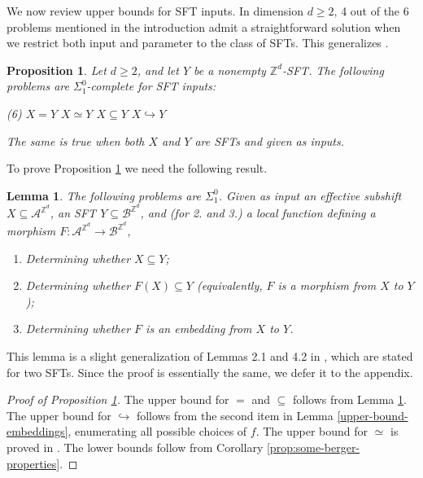 \documentclass[a4paper]{article}
\newcommand{\Z}{\mathbb{Z}}
\newcommand{\Zd}{\mathbb{Z}^d}
\newcommand{\A}{\mathcal{A}}
\newcommand{\B}{\mathcal{B}}
\newtheorem{lemma}[theorem]{Lemma}
\newtheorem{proposition}[theorem]{Proposition}
\theoremstyle{definition}
\begin{document}
We now review upper bounds for SFT inputs. In dimension $d\geq 2$, 4 out of the 6 problems mentioned in the introduction admit a straightforward solution when we restrict both input and parameter to the class of SFTs. This generalizes \cite[Theorem 2.4]{jeandel_hardness_2015}. 

\begin{proposition}\label{upper-bounds-two-SFTs}\label{upper-bound-inclusion-uniform-sfts}\label{conjugacy-two-SFTs} 
Let $d\geq 2$, and let $Y$ be a nonempty $\Z^d$-SFT. The following problems are $\Sigma_1^0$-complete for SFT inputs:
\begin{tasks}[style=itemize](6)
    \task $X=Y$
    \task $X\simeq Y$
    \task $X\subseteq Y$
    \task $X\hookrightarrow Y$
\end{tasks} 
The same is true when both $X$ and $Y$ are SFTs and given as inputs.
\end{proposition}

To prove Proposition \ref{upper-bounds-two-SFTs} we need the following result. 
\begin{lemma}\label{upper-bound-morphisms}\label{upper-bound-embeddings}\label{upper-bound-inclusion}
    The following problems are $\Sigma_1^0$.
    Given as input an effective subshift $X\subseteq \A^{\Zd}$, an SFT $Y\subseteq \B^{\Zd}$, and (for 2. and 3.) a local function defining a morphism $F\colon \A^{\Zd}\to \B^{\Zd}$,
    \begin{enumerate}
    \item Determining whether $X\subseteq Y$;
    \item Determining whether $F(X)\subseteq Y$ (equivalently, $F$ is a morphism from $X$ to $Y$);
    \item Determining whether $F$ is an embedding from $X$ to $Y$.
    \end{enumerate}
\end{lemma}

This lemma is a slight generalization of Lemmas 2.1 and 4.2 in \cite{jeandel_hardness_2015}, which are stated for two SFTs. Since the proof is essentially the same, we defer it to the appendix.
 \begin{proof}[Proof of Proposition \ref{upper-bounds-two-SFTs}]
 The upper bound for $=$ and $\subseteq$ follows from Lemma \ref{upper-bound-morphisms}. The upper bound for $\hookrightarrow$ follows from the second item in Lemma \ref{upper-bound-embeddings}, enumerating all possible choices of $f$. The upper bound for $\simeq$ is proved in \cite[Theorem 2.3]{jeandel_hardness_2015}. 
 The lower bounds follow from Corollary \ref{prop:some-berger-properties}. 
\end{proof}
\end{document}
